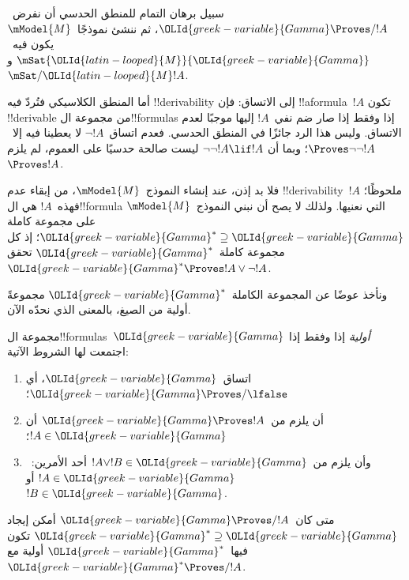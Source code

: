\documentclass[../../../include/open-logic-section]{subfiles}
\begin{document}


سبيل برهان التمام للمنطق الحدسي أن نفرض~${\OLId{greek-variable}{Gamma}} \Proves/ !A$، ثم ننشئ
نموذجًا~$\mModel{M}$ يكون فيه~$\mSat{{\OLId{latin-looped}{M}}}{{\OLId{greek-variable}{Gamma}}}$ و$\mSat/{{\OLId{latin-looped}{M}}}{!A}$.

أما المنطق الكلاسيكي فتُردّ فيه !!{derivability} إلى الاتساق: فإن
!!a{formula}~$!A$ تكون !!{derivable} من مجموعة
ال!!{formula}s إذا وفقط إذا صار ضم نفي~$!A$ إليها موجبًا لعدم الاتساق.
وليس هذا الرد جائزًا في المنطق الحدسي. فعدم اتساق~$\lnot !A$
لا يعطينا فيه إلا~$\Proves \lnot\lnot !A$؛ وبما أن
$\lnot\lnot !A \lif !A$ ليست صالحة حدسيًا على العموم، لم يلزم
$\Proves !A$.

فلا بد إذن، عند إنشاء النموذج~$\mModel{M}$، من إبقاء عدم
!!{derivability}~$!A$ ملحوظًا؛ فهذه~$!A$ هي ال!!{formula} التي نعنيها.
ولذلك لا يصح أن نبني النموذج~$\mModel{M}$ على مجموعة كاملة
${\OLId{greek-variable}{Gamma}}^* \supseteq {\OLId{greek-variable}{Gamma}}$؛ إذ كل مجموعة كاملة~${\OLId{greek-variable}{Gamma}}^*$ تحقق
${\OLId{greek-variable}{Gamma}}^* \Proves !A \lor \lnot !A$.

ونأخذ عوضًا عن المجموعة الكاملة~${\OLId{greek-variable}{Gamma}}^*$ مجموعةً أولية من الصيغ،
بالمعنى الذي نحدّه الآن.

\begin{defn}
  مجموعة ال!!{formula}s~${\OLId{greek-variable}{Gamma}}$ \emph{أولية} إذا وفقط إذا اجتمعت لها
  الشروط الآتية:
  \begin{enumerate}
  \item{} اتساق~${\OLId{greek-variable}{Gamma}}$، أي
    ${\OLId{greek-variable}{Gamma}} \Proves/ \lfalse$؛
  \item{} أن يلزم من~${\OLId{greek-variable}{Gamma}} \Proves !A$ أن
    $!A \in {\OLId{greek-variable}{Gamma}}$؛
  \item{} وأن يلزم من~$!A \lor !B \in {\OLId{greek-variable}{Gamma}}$ أحد
    الأمرين:~$!A \in {\OLId{greek-variable}{Gamma}}$ أو~$!B \in {\OLId{greek-variable}{Gamma}}$.
  \end{enumerate}
\end{defn}

\begin{lem}[لمّة ليندنباوم]
   متى كان~${\OLId{greek-variable}{Gamma}} \Proves/ !A$ أمكن إيجاد
  ${\OLId{greek-variable}{Gamma}}^* \supseteq {\OLId{greek-variable}{Gamma}}$ تكون فيها~${\OLId{greek-variable}{Gamma}}^*$ أولية مع
  ${\OLId{greek-variable}{Gamma}}^* \Proves/ !A$.
\end{lem}
\end{document}
